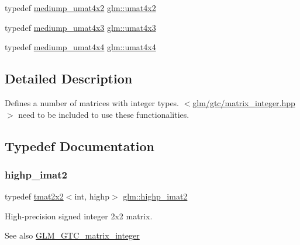 \begin{DoxyCompactItemize}
\item 
typedef \hyperlink{group__gtc__matrix__integer_ga9dd5ce011ca43d90cf1b94084c7e90ac}{mediump\+\_\+umat4x2} \hyperlink{group__gtc__matrix__integer_ga13e8392218e9b6e1b7f194a21b5c88bf}{glm\+::umat4x2}
\item 
typedef \hyperlink{group__gtc__matrix__integer_gac91ed5aa76fe160d5ab5d31e2b94d95b}{mediump\+\_\+umat4x3} \hyperlink{group__gtc__matrix__integer_ga08373f5588a54da1a48e5e55c7d51004}{glm\+::umat4x3}
\item 
typedef \hyperlink{group__gtc__matrix__integer_ga7141a9d9f1c26521e397be34d19c1b8f}{mediump\+\_\+umat4x4} \hyperlink{group__gtc__matrix__integer_gae0931b79e808fb0983848778a60eb548}{glm\+::umat4x4}
\end{DoxyCompactItemize}


\subsection{Detailed Description}
Defines a number of matrices with integer types. $<$\hyperlink{matrix__integer_8hpp}{glm/gtc/matrix\+\_\+integer.\+hpp}$>$ need to be included to use these functionalities. 

\subsection{Typedef Documentation}
\mbox{\label{group__gtc__matrix__integer_gae1cd6ff099593d2f215bd4ceed538200}} 
\subsubsection{\texorpdfstring{highp\+\_\+imat2}{highp\_imat2}}
{\footnotesize\ttfamily typedef \hyperlink{structglm_1_1tmat2x2}{tmat2x2}$<$int, highp$>$ \hyperlink{group__gtc__matrix__integer_gae1cd6ff099593d2f215bd4ceed538200}{glm\+::highp\+\_\+imat2}}

High-\/precision signed integer 2x2 matrix. \begin{DoxySeeAlso}{See also}
\hyperlink{group__gtc__matrix__integer}{G\+L\+M\+\_\+\+G\+T\+C\+\_\+matrix\+\_\+integer} 
\end{DoxySeeAlso}
\mbox{\label{group__gtc__matrix__integer_gab4411f2d106d24a32aaa3cb711dc8510}} 
